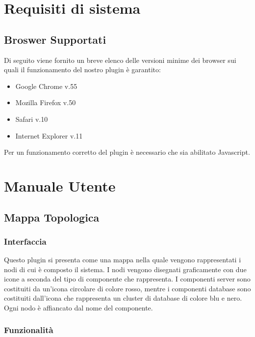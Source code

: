 \section{Requisiti di sistema}
\subsection{Broswer Supportati}

Di seguito viene fornito un breve elenco delle versioni minime dei browser sui quali il funzionamento del nostro plugin è garantito:
\begin{itemize}
	
	\item Google Chrome v.55
	\item Mozilla Firefox v.50
	\item Safari v.10
	\item Internet Explorer v.11
	
\end{itemize}

Per un funzionamento corretto del plugin è necessario che sia abilitato Javascript.


\section{Manuale Utente}
\subsection{Mappa Topologica}
\label{sec:mtopologica}
\subsubsection{Interfaccia}
Questo plugin si presenta come una mappa nella quale vengono rappresentati i nodi di cui è composto il sistema.
I nodi vengono disegnati graficamente con due icone a seconda del tipo di componente che rappresenta. I componenti server sono costituiti da un'icona circolare di colore rosso, mentre i componenti database sono costituiti dall'icona che rappresenta un cluster di database di colore blu e nero. Ogni nodo è affiancato dal nome del componente.

\subsubsection{Funzionalità}
